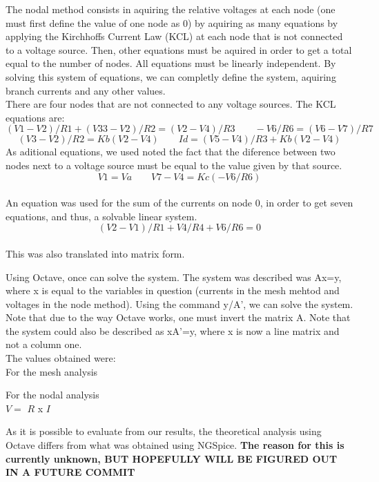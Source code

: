 The nodal method consists in aquiring the relative voltages at each node (one must first define the value of one node as 0) by aquiring as many equations by applying the Kirchhoffs Current Law (KCL) at each node that is not connected to a voltage source. Then, other equations must be aquired in order to get a total equal to the number of nodes. All equations must be linearly independent. By solving this system of equations, we can completly define the system, aquiring branch currents and any other values.\\
There are four nodes that are not connected to any voltage sources. The KCL equations are: 
\[(V1-V2)/R1+(V33-V2)/R2=(V2-V4)/R3 \quad \quad -V6/R6=(V6-V7)/R7\]
 \[(V3-V2)/R2=Kb(V2-V4) \quad \quad Id=(V5-V4)/R3+Kb(V2-V4) \]
As aditional equations, we used noted the fact that the diference between two nodes next to a voltage source must be equal to the value given by that source. 
\[V1=Va \quad \quad  V7-V4=Kc(-V6/R6)\]\\
An equation was used for the sum of the currents on node 0, in order to get seven equations, and thus, a solvable linear system.
 \[(V2-V1)/R1+V4/R4+V6/R6=0\]\\
This was also translated into matrix form.







Using Octave, once can solve the system. The system was described was Ax=y, where x is equal to the variables in question (currents in the mesh mehtod and voltages in the node method). Using the command y/A', we can solve the system. Note that due to the way Octave works, one must invert the matrix A. Note that the system could also be described as xA'=y, where x is now a line matrix and not a column one.\\
The values obtained were:\\


For the mesh analysis


For the nodal analysis\\

$V =$  $R$ x $I$ 


As it is possible to evaluate from our results, the theoretical analysis using Octave differs from what was obtained using NGSpice. \textbf{The reason for this is currently unknown, BUT HOPEFULLY WILL BE FIGURED OUT IN A FUTURE COMMIT}

